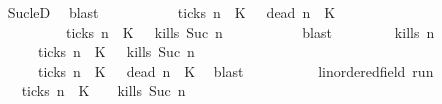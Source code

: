 \begin{isabellebody}
\ \ \ \ \ \ \ \ \isamarkupfalse%
\ Suc{\isacharunderscore}leD\ \isamarkupfalse%
\ blast\isanewline
\ \ \ \ \ \ \isamarkupfalse%
\ {\isacartoucheopen}{\isasymrho}\ {\isasymin}\ {\isacharparenleft}{\isacharbraceleft}{\isasymrho}{\isachardot}\ {\isacharquery}ticks\ n\ {\isasymrho}\ K\ {\isasyminter}\ {\isacharbraceleft}{\isasymrho}{\isachardot}\ {\isacharquery}dead\ n\ {\isasymrho}\ K\isanewline
\ \ \ \ \ \ \ \ \ \ \ \ \ \ \ {\isasymunion}\ {\isacharparenleft}{\isacharbraceleft}{\isasymrho}{\isachardot}\ {\isasymnot}\ {\isacharquery}ticks\ n\ {\isasymrho}\ K\ {\isasyminter}\ {\isacharbraceleft}{\isasymrho}{\isachardot}\ {\isacharquery}kills\ {\isacharparenleft}Suc\ n{\isacharparenright}\ {\isasymrho}{\isacharbraceright}{\isacharparenright}{\isacartoucheclose}\isanewline
\ \ \ \ \ \ \ \ \isamarkupfalse%
\ blast\isanewline
\ \ \ \ \isacommand{{\isacharbraceright}}\isamarkupfalse%
\ \isamarkupfalse%
\ {\isacartoucheopen}{\isacharbraceleft}{\isasymrho}{\isachardot}\ {\isacharquery}kills\ n\ {\isasymrho}{\isacharbraceright}\isanewline
\ \ \ \ \ \ \ \ \ \ \ {\isasymsubseteq}\ {\isacharbraceleft}{\isasymrho}{\isachardot}\ {\isasymnot}\ {\isacharquery}ticks\ n\ {\isasymrho}\ K\ {\isasyminter}\ {\isacharbraceleft}{\isasymrho}{\isachardot}\ {\isacharquery}kills\ {\isacharparenleft}Suc\ n{\isacharparenright}\ {\isasymrho}{\isacharbraceright}\ \isanewline
\ \ \ \ \ \ \ \ \ \ \ \ {\isasymunion}\ {\isacharbraceleft}{\isasymrho}{\isachardot}\ {\isacharquery}ticks\ n\ {\isasymrho}\ K\ {\isasyminter}\ {\isacharbraceleft}{\isasymrho}{\isachardot}\ {\isacharquery}dead\ n\ {\isasymrho}\ K\ \isamarkupfalse%
\ blast\isanewline
\ \ \isamarkupfalse%
\isanewline
\ \ \ \ \isacommand{{\isacharbraceleft}}\isamarkupfalse%
\ \isamarkupfalse%
\ {\isasymrho}{\isacharcolon}{\isacharcolon}{\isacartoucheopen}{\isacharprime}{\isasymtau}{\isacharcolon}{\isacharcolon}linordered{\isacharunderscore}field\ run{\isacartoucheclose}\isanewline
\ \ \ \ \ \ \isamarkupfalse%
\ {\isacartoucheopen}{\isasymrho}\ {\isasymin}\ {\isacharparenleft}{\isacharbraceleft}{\isasymrho}{\isachardot}\ {\isasymnot}\ {\isacharquery}ticks\ n\ {\isasymrho}\ K\ \ {\isasyminter}\ {\isacharbraceleft}{\isasymrho}{\isachardot}\ {\isacharquery}kills\ {\isacharparenleft}Suc\ n{\isacharparenright}\ {\isasymrho}{\isacharbraceright}{\isacharparenright}\isanewline

\end{isabellebody}
